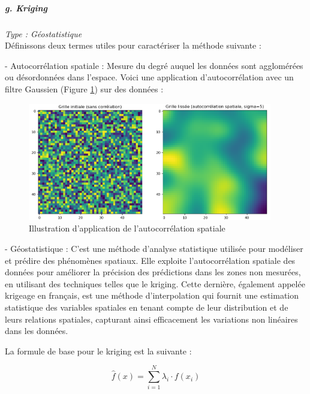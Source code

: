 


\subparagraph{g. Kriging \cite{palmer2009, kringing}}
\textit{Type : Géostatistique} \\
\phantom{----}Définissons deux termes utiles pour caractériser la méthode suivante :

- Autocorrélation spatiale : Mesure du degré auquel les données sont agglomérées ou désordonnées dans l'espace. Voici une application d'autocorrélation avec un filtre Gaussien (Figure \ref{fig:autocorrelation}) sur des données :
\begin{figure}[H]
    \centering
    \includegraphics[width=0.95\textwidth]{images/autocorrelation.png}
    \caption{Illustration d'application de l'autocorrélation spatiale}
    \label{fig:autocorrelation}
\end{figure}
- Géostatistique : C'est une méthode d'analyse statistique utilisée pour modéliser et prédire des phénomènes spatiaux. Elle exploite l'autocorrélation spatiale des données pour améliorer la précision des prédictions dans les zones non mesurées, en utilisant des techniques telles que le kriging. Cette dernière, également appelée krigeage en français, est une méthode d'interpolation qui fournit une estimation statistique des variables spatiales en tenant compte de leur distribution et de leurs relations spatiales, capturant ainsi efficacement les variations non linéaires dans les données.

\newpage

La formule de base pour le kriging est la suivante :

\begin{equation}
    \hat{f}(x) = \sum_{i=1}^{N} \lambda_i \cdot {f}(x_i)
\end{equation}


